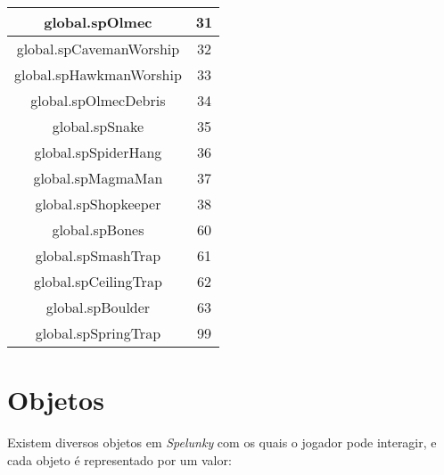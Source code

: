 \begin{center}
    \begin{tabular}{ |c|c| }
        \hline
        global.spOlmec & 31 \\ \hline
        global.spCavemanWorship & 32 \\ \hline
        global.spHawkmanWorship & 33 \\ \hline
        global.spOlmecDebris & 34 \\ \hline
        global.spSnake & 35 \\ \hline
        global.spSpiderHang & 36 \\ \hline
        global.spMagmaMan & 37 \\ \hline
        global.spShopkeeper & 38 \\ \hline
        global.spBones & 60 \\ \hline
        global.spSmashTrap & 61 \\ \hline
        global.spCeilingTrap & 62 \\ \hline
        global.spBoulder & 63 \\ \hline
        global.spSpringTrap & 99 \\ \hline
    \end{tabular}
\end{center}

\section{Objetos}
Existem diversos objetos em \textit{Spelunky} com os quais o jogador pode
interagir, e cada objeto é representado por um valor:

